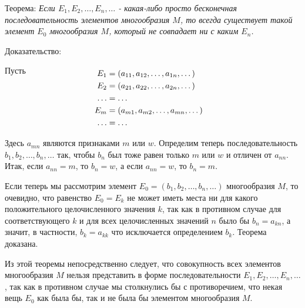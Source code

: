 \documentclass[12pt]{article}
\begin{document}
Теорема: {\sl Если $E_1, E_2, \dots, E_n, \dots$ - какая-либо просто бесконечная последовательность элементов многообразия $M$, то всегда существует такой элемент $E_0$ многообразия $M$, который не совпадает ни с каким $E_n$.}

Доказательство:

Пусть
\begin{align}
\begin{split}
\\[-2\baselineskip]
E_1 &= (a_{11}, a_{12}, \dots, a_{1n}, \dots)\\
E_2 &= (a_{21}, a_{22}, \dots, a_{2n}, \dots)\\
\dots &= \dots\\
E_m &= (a_{m1}, a_{m2}, \dots, a_{mn}, \dots)\\
\dots &= \dots
\end{split}
\end{align}

Здесь $a_{mn}$ являются признаками $m$ или $w$. Определим теперь последовательность $b_1, b_2, \dots, b_n, \dots$ так, чтобы $b_n$ был тоже равен только $m$ или $w$ и отличен от $a_{nn}$. Итак, если $a_{nn} = m$, то $b_n = w$, а если $a_{nn} = w$, то $b_n = m$.

Если теперь мы рассмотрим элемент $E_0 = (b_1, b_2, \dots, b_n, \dots)$ многообразия $M$, то очевидно, что равенство $E_0 = E_k$ не может иметь места ни для какого положительного целочисленного значения $k$, так как в противном случае для соответствующего $k$ и для всех целочисленных значений $n$ было бы $b_n = a_{kn}$, а значит, в частности, $b_k = a_{kk}$ что исключается определением $b_k$. Теорема доказана.

Из этой теоремы непосредственно следует, что совокупность всех элементов многообразия $M$ нельзя представить в форме последовательности $E_1, E_2, \dots, E_n, \dots$, так как в противном случае мы столкнулись бы с противоречием, что некая вещь $E_0$ как была бы, так и не была бы элементом многообразия $M$.
\end{document}
